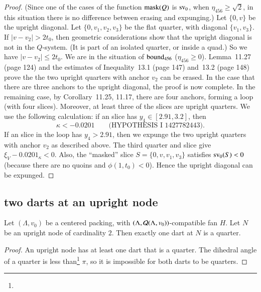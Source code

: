 \begin{proof}
  (Since one of the cases of
the function ${\operatorname{mask}}(Q)$ is ${\operatorname{sv}}_0$, when
$\eta_{456}\ge\sqrt2$, in this situation there is no difference between erasing and expunging.) Let $\{0,v\}$ be the upright
diagonal.  Let $\{0,v_1,v_2,v_3\}$ be the flat quarter, with
diagonal $\{v_1,v_3\}$.  If $|v-v_2|>2t_0$, then geometric
considerations show that the upright diagonal is not in the
$Q$-system.  (It is part of an isolated quarter, or inside
a quad.)  So we have $|v-v_2|\le 2t_0$.  We are in the situation of
${\operatorname{bound}}_{456}$ ($\eta_{456}\ge0$).  
Lemma~11.27 (page 124) and the estimates
of Inequality~13.1 (page 147) and~13.2 (page 148)
prove the the two upright quarters with anchor $v_2$ can
be erased.  In the case that there are three anchors to the upright diagonal, the proof is now complete.  In the remaining case, by Corollary~11.25, 11.17, there are four anchors, forming a loop (with four slices).  Moreover, at least three of the slices are upright quarters.  We use the following
calculation: if an slice has $y_4\in [2.91,3.2]$, then
\begin{equation}\label{eqn:0201}
 \kappa < -0.0201\qquad\text{(HYPOTHESIS I 1427782443)}.
\end{equation}
If an slice
in the loop has $y_4> 2.91$, then we expunge the two upright quarters with anchor $v_2$ as described above. The third quarter and
slice give
  $\xi_V - 0.0201_\kappa < 0$.
Also, the ``masked''
slice $S=\{0,v,v_1,v_3\}$ satisfies ${\operatorname{sv}}_0(S) <0$
(because there are no quoins and $\phi(1,t_0)<0$).
Hence the upright diagonal can be expunged.
\end{proof}



\subsection{two darts at an upright node}


\begin{lemma}
Let $(\Lambda,v_0)$ be a centered packing, with $(\Lambda,{\mathcal Q}(\Lambda,v_0))$-compatible fan $H$. Let $N$ be an upright node
of cardinality $2$.  Then exactly one dart at $N$ is a quarter.
\end{lemma}

\begin{proof}
An upright node has at least one dart that is a quarter.
The dihedral angle of a quarter is
less than\footnote{} $\pi$, so it is
impossible for both darts to be quarters.
\end{proof}

